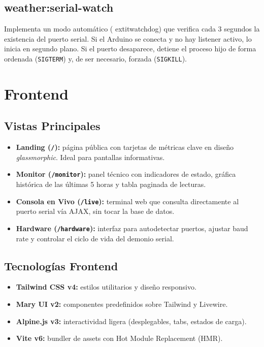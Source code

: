 \documentclass[12pt,a4paper]{report}
\begin{document}
\subsection{weather:serial-watch}
\label{subsec:serial-watch}

Implementa un modo automático (	extit{watchdog}) que verifica cada 3 segundos la existencia del puerto serial. Si el Arduino se conecta y no hay listener activo, lo inicia en segundo plano. Si el puerto desaparece, detiene el proceso hijo de forma ordenada (\texttt{SIGTERM}) y, de ser necesario, forzada (\texttt{SIGKILL}).

\section{Frontend}
\label{sec:frontend}

\subsection{Vistas Principales}
\label{subsec:vistas}

\begin{itemize}[leftmargin=*]
    \item \textbf{Landing (\texttt{/}):} página pública con tarjetas de métricas clave en diseño \textit{glassmorphic}. Ideal para pantallas informativas.
    \item \textbf{Monitor (\texttt{/monitor}):} panel técnico con indicadores de estado, gráfica histórica de las últimas 5 horas y tabla paginada de lecturas.
    \item \textbf{Consola en Vivo (\texttt{/live}):} terminal web que consulta directamente al puerto serial vía AJAX, sin tocar la base de datos.
    \item \textbf{Hardware (\texttt{/hardware}):} interfaz para autodetectar puertos, ajustar baud rate y controlar el ciclo de vida del demonio serial.
\end{itemize}

\subsection{Tecnologías Frontend}
\label{subsec:tech-frontend}

\begin{itemize}[leftmargin=*]
    \item \textbf{Tailwind CSS v4:} estilos utilitarios y diseño responsivo.
    \item \textbf{Mary UI v2:} componentes predefinidos sobre Tailwind y Livewire.
    \item \textbf{Alpine.js v3:} interactividad ligera (desplegables, tabs, estados de carga).
    \item \textbf{Vite v6:} bundler de assets con Hot Module Replacement (HMR).
\end{itemize}
\end{document}
